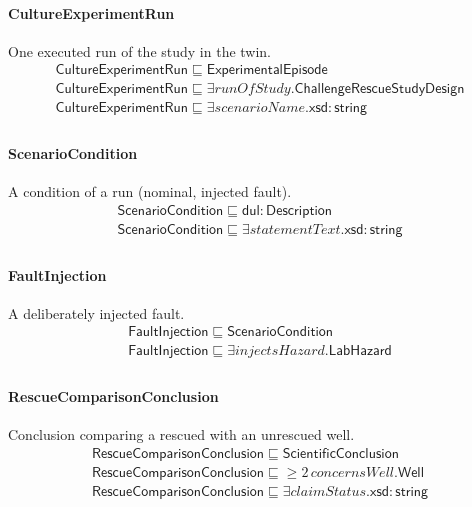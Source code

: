 \documentclass[10pt]{article}
\begin{document}
\paragraph{CultureExperimentRun} One executed run of the study in the twin.
\[\begin{array}{l}
\mathsf{CultureExperimentRun} \sqsubseteq  \mathsf{ExperimentalEpisode} \\
\mathsf{CultureExperimentRun} \sqsubseteq  \exists \mathit{runOfStudy}.\mathsf{ChallengeRescueStudyDesign} \\
\mathsf{CultureExperimentRun} \sqsubseteq  \exists \mathit{scenarioName}.\mathsf{xsd{:}string} \\
\end{array}\]
\paragraph{ScenarioCondition} A condition of a run (nominal, injected fault).
\[\begin{array}{l}
\mathsf{ScenarioCondition} \sqsubseteq  \mathsf{dul{:}Description} \\
\mathsf{ScenarioCondition} \sqsubseteq  \exists \mathit{statementText}.\mathsf{xsd{:}string} \\
\end{array}\]
\paragraph{FaultInjection} A deliberately injected fault.
\[\begin{array}{l}
\mathsf{FaultInjection} \sqsubseteq  \mathsf{ScenarioCondition} \\
\mathsf{FaultInjection} \sqsubseteq  \exists \mathit{injectsHazard}.\mathsf{LabHazard} \\
\end{array}\]
\paragraph{RescueComparisonConclusion} Conclusion comparing a rescued with an unrescued well.
\[\begin{array}{l}
\mathsf{RescueComparisonConclusion} \sqsubseteq  \mathsf{ScientificConclusion} \\
\mathsf{RescueComparisonConclusion} \sqsubseteq  \geq 2\, \mathit{concernsWell}.\mathsf{Well} \\
\mathsf{RescueComparisonConclusion} \sqsubseteq  \exists \mathit{claimStatus}.\mathsf{xsd{:}string} \\
\end{array}\]
\end{document}
